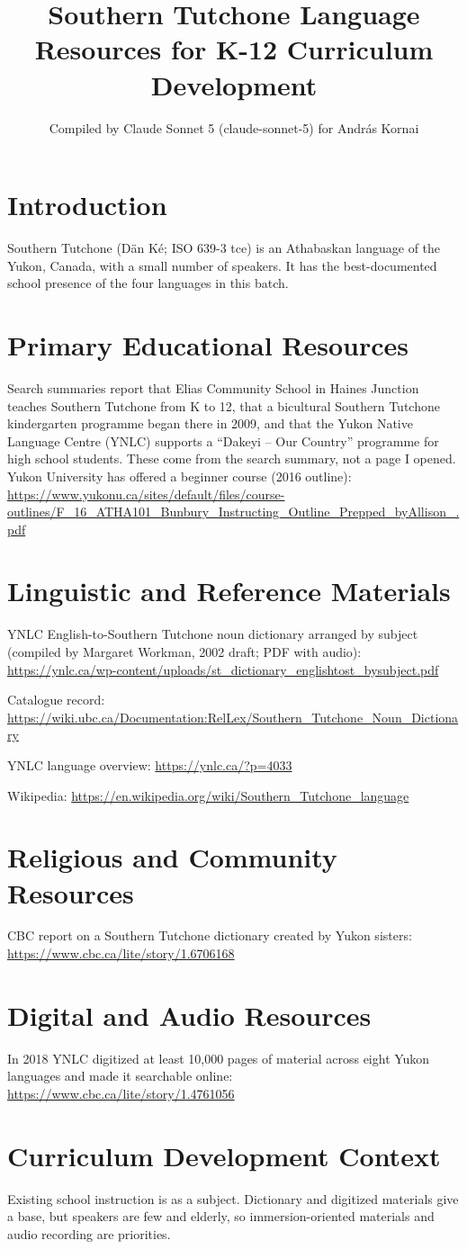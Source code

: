 \documentclass[12pt]{article}
\title{Southern Tutchone Language Resources for K-12 Curriculum Development}
\author{Compiled by Claude Sonnet 5 (claude-sonnet-5) for Andr\'as Kornai}
\date{}
\begin{document}
\maketitle
\section{Introduction}
Southern Tutchone (D\"an K\'e; ISO 639-3 tce) is an Athabaskan language of the Yukon, Canada, with a small number of speakers. It has the best-documented school presence of the four languages in this batch.
\section{Primary Educational Resources}
Search summaries report that Elias Community School in Haines Junction teaches Southern Tutchone from K to 12, that a bicultural Southern Tutchone kindergarten programme began there in 2009, and that the Yukon Native Language Centre (YNLC) supports a ``Dakeyi -- Our Country'' programme for high school students. These come from the search summary, not a page I opened. Yukon University has offered a beginner course (2016 outline):
\url{https://www.yukonu.ca/sites/default/files/course-outlines/F_16_ATHA101_Bunbury_Instructing_Outline_Prepped_byAllison_.pdf}
\section{Linguistic and Reference Materials}
YNLC English-to-Southern Tutchone noun dictionary arranged by subject (compiled by Margaret Workman, 2002 draft; PDF with audio): \url{https://ynlc.ca/wp-content/uploads/st_dictionary_englishtost_bysubject.pdf}

Catalogue record: \url{https://wiki.ubc.ca/Documentation:RelLex/Southern_Tutchone_Noun_Dictionary}

YNLC language overview: \url{https://ynlc.ca/?p=4033}

Wikipedia: \url{https://en.wikipedia.org/wiki/Southern_Tutchone_language}
\section{Religious and Community Resources}
CBC report on a Southern Tutchone dictionary created by Yukon sisters: \url{https://www.cbc.ca/lite/story/1.6706168}
\section{Digital and Audio Resources}
In 2018 YNLC digitized at least 10,000 pages of material across eight Yukon languages and made it searchable online: \url{https://www.cbc.ca/lite/story/1.4761056}
\section{Curriculum Development Context}
Existing school instruction is as a subject. Dictionary and digitized materials give a base, but speakers are few and elderly, so immersion-oriented materials and audio recording are priorities.
\end{document}
